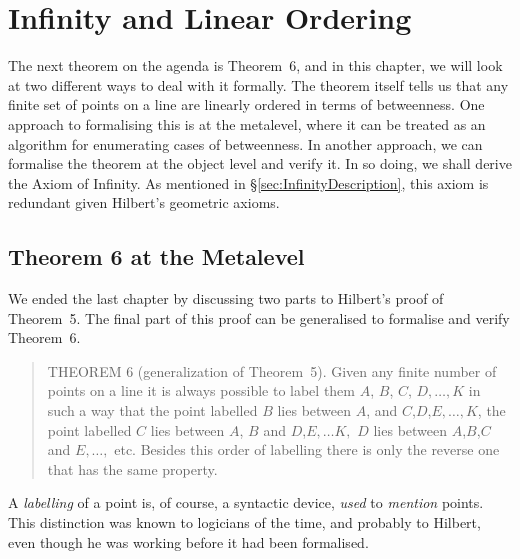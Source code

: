 \chapter{Infinity and Linear Ordering}\label{chapter:LinearOrder}
The next theorem on the agenda is Theorem~6, and in this chapter, we will look at two different ways to deal with it formally. The theorem itself tells us that any finite set of points on a line are linearly ordered in terms of betweenness. One approach to formalising this is at the metalevel, where it can be treated as an algorithm for enumerating cases of betweenness. In another approach, we can formalise the theorem at the object level and verify it. In so doing, we shall derive the Axiom of Infinity. As mentioned in \S\ref{sec:InfinityDescription}, this axiom is redundant given Hilbert's geometric axioms.

\section{Theorem 6 at the Metalevel}\label{sec:Theorem6}
We ended the last chapter by discussing two parts to Hilbert's proof of Theorem~5. The final part of this proof can be generalised to formalise and verify Theorem~6.

\begin{quote}THEOREM 6 (generalization of Theorem~5). Given any finite number of points on a line it is always possible to label them $A$, $B$, $C$, $D, \ldots, K$ in such a way that the point labelled $B$ lies between $A$, and $C$,$D$,$E, \ldots, K$, the point labelled $C$ lies between $A$, $B$ and $D$,$E,\ldots K,$ $D$ lies between $A$,$B$,$C$ and $E, \ldots,$ etc. Besides this order of labelling there is only the reverse one that has the same property.
\end{quote}

A \emph{labelling} of a point is, of course, a syntactic device, \emph{used} to \emph{mention} points. This distinction was known to logicians of the time, and probably to Hilbert, even though he was working before it had been formalised.

